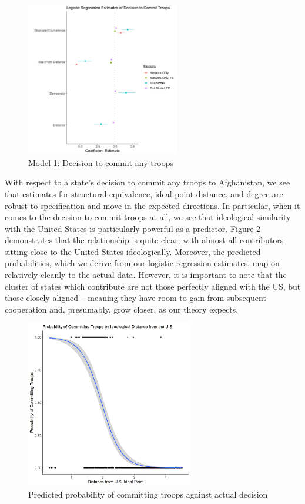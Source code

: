\documentclass[12pt,letterpaper]{article}
\begin{document}
			\begin{figure}[H]
				\centering
					\includegraphics[width=0.6\textwidth]{logit_coef.png}
				\caption{Model 1: Decision to commit any troops}
				\label{fig:logit_reg}
			\end{figure}

		With respect to a state's decision to commit any troops to Afghanistan, we see that estimates for structural equivalence, ideal point distance, and degree are robust to specification and move in the expected directions. In particular, when it comes to the decision to commit troops at all, we see that ideological similarity with the United States is particularly powerful as a predictor. Figure \ref{fig:logit} demonstrates that the relationship is quite clear, with almost all contributors sitting close to the United States ideologically. Moreover, the predicted probabilities, which we derive from our logistic regression estimates, map on relatively cleanly to the actual data. However, it is important to note that the cluster of states which contribute are not those perfectly aligned with the US, but those closely aligned -- meaning they have room to gain from subsequent cooperation and, presumably, grow closer, as our theory expects.

			\begin{figure}[H]
			\centering
				\includegraphics[width=0.65\textwidth]{logit.png}
			\caption{Predicted probability of committing troops against actual decision}
			\label{fig:logit}
			\end{figure}
\end{document}
